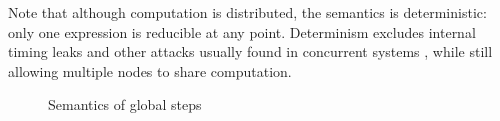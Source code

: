 
Note that although computation is distributed, 
the semantics is deterministic:  only one expression is reducible at any point. Determinism excludes internal timing leaks and other attacks usually found in concurrent systems \cite{Smith:1998:SIF:268946.268975, Muller:2012:TPS:2384616.2384621}, while still allowing multiple nodes to share computation.

\begin{figure}
\centering
{}
\caption{Semantics of global steps}
\label{fig:global-steps}
\end{figure}

